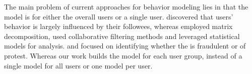The main problem of current approaches for behavior modeling lies in that the model is for either the overall users or a single user.
\cite{IEEEexample:conf/wsdm/FengW13,IEEEexample:conf/ijcai/ZhangLTCL13} discovered that users' \retg{} behavior is largely influenced by their followees, whereas \cite{IEEEexample:conf/cikm/JiangLSW15} employed matrix decomposition, \cite{IEEEexample:conf/sigir/JiangLSLLMW16} used collaborative filtering methods and \cite{IEEEexample:zhang2015retweet} leveraged statistical models for \retg{} analysis.
\cite{IEEEexample:conf/pakdd/GiatsoglouCSFV15} and \cite{IEEEexample:journals/corr/RanganathMHTL15} focused on identifying whether the \retg{} is fraudulent or of protest.
Whereas our work \sys{} builds the \retg{} model for each user group, instead of a single model for all users or one model per user.

